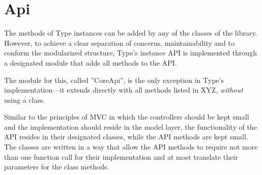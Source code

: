 

\section{Api}



The methods of Type instances can be added by any of the classes of the library. However, to achieve a clear separation of concerns, maintainability and to conform the modularized structure, Type's instance API is implemented through a designated module that adds all methods to the API.

The module for this, called ''CoreApi'', is the only exception in Type's implementation---it extends  directly with all methods listed in XYZ, \textit{without} using a class.

Similar to the principles of MVC in which the controllers should be kept small and the implementation should reside in the model layer, the functionality of the API resides in their designated classes, while the API methods are kept small. The classes are written in a way that allow the API methods to require not more than one function call for their implementation and at most translate their parameters for the class methods.


